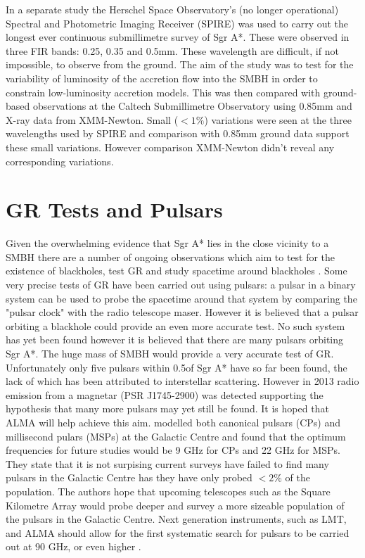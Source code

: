 \documentclass[a4paper,12pt]{article}
\begin{document}
In a separate study \citep{stone} the Herschel Space Observatory's (no longer operational) Spectral and Photometric Imaging Receiver (SPIRE) was used to carry out the longest ever continuous 
submillimetre 
survey of Sgr A*. These were observed in three FIR bands: 0.25, 0.35 and 0.5mm. These wavelength are difficult, if not impossible, to observe from the ground. The aim of the study
was to test for the variability of luminosity of the accretion flow into the SMBH in order to constrain low-luminosity accretion models.
This was then compared with ground-based observations at the Caltech Submillimetre Observatory using 0.85mm and X-ray data from XMM-Newton. 
Small ($<1\%$) variations were seen at the three wavelengths
used by SPIRE and comparison with 0.85mm ground data support these small variations. However comparison XMM-Newton didn't reveal any corresponding variations. 

\section{GR Tests and Pulsars}
Given the overwhelming evidence that Sgr A* lies in the close vicinity to a SMBH there are a number of ongoing observations which aim to test for the existence of blackholes, test GR and study 
spacetime around blackholes \citep{goddi}. Some very precise tests of GR have been carried out using pulsars: a pulsar in a binary system can be used to probe the spacetime around that system by comparing the 
"pulsar clock" with the radio telescope maser. However it is believed that a pulsar orbiting a blackhole could provide an even more accurate test. No such system has yet been found however it is 
believed that there are many pulsars orbiting Sgr A*. The huge mass of SMBH would provide a very accurate test of GR. Unfortunately only five pulsars \citep{goddi} within 0.5\degree of Sgr A* have so far
 been found,
the lack of which has been attributed to interstellar scattering. 
However in 2013 radio emission from a magnetar (PSR J1745-2900) was detected supporting the hypothesis that many more pulsars may
 yet still be found. It is hoped that ALMA will help achieve this aim.
\cite{rajwade} modelled both canonical pulsars (CPs) and millisecond pulars (MSPs) at the Galactic Centre and found that the optimum frequencies for future studies would be 9 GHz for CPs and 22 GHz
for MSPs. They state that it is not surpising current surveys have failed to find many pulsars in the Galactic Centre has they have only probed $<2\%$ of the population.
The authors hope that upcoming telescopes such as the Square Kilometre Array would probe deeper and survey a more sizeable population of the pulsars in the Galactic Centre.
Next generation instruments, such as LMT, and ALMA should allow for the first systematic search for pulsars to be carried out at 90 GHz, or even higher \citep{goddi}.
\end{document}
